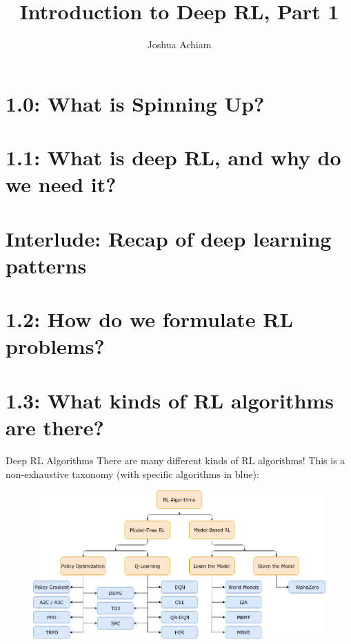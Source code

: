 \documentclass[9pt]{beamer}
\begin{document}


\title{Introduction to Deep RL, Part 1}
\author{Joshua Achiam}

\begin{frame}
\titlepage
\end{frame}


\section{1.0: What is Spinning Up?}



\section{1.1: What is deep RL, and why do we need it?}



\section{Interlude: Recap of deep learning patterns}



\section{1.2: How do we formulate RL problems?}



\section{1.3: What kinds of RL algorithms are there?}

\begin{frame}{Deep RL Algorithms}
There are many different kinds of RL algorithms! This is a non-exhaustive taxonomy (with specific algorithms in blue):
\begin{figure}
\centering
\includegraphics[width=\linewidth]{rl_algorithms_9_15}
\end{figure}
\end{frame}
\end{document}
